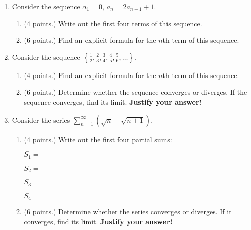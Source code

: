 \documentclass[12pt]{article}
\newcommand{\ds}{\displaystyle}
\newcommand{\points}[1]{(#1 points.)}		%
\begin{document}
\begin{enumerate}

\item Consider the sequence $a_1 = 0$, $a_n = 2a_{n-1} + 1$.
  \begin{enumerate}
  \item \points{4} Write out the first four terms of this sequence.
    \vfill

  \item \points{6} Find an explicit formula for the $n$th term of this sequence.
    \vfill
  \end{enumerate}

\item Consider the sequence $\ds \left\{ \frac{1}{2}, \frac{2}{3},
    \frac{3}{4}, \frac{4}{5}, \frac{5}{6}, \dots \right\}$.

  \begin{enumerate}
  \item \points{4} Find an explicit formula for the $n$th term of this sequence.
    \vfill

  \item \points{6} Determine whether the sequence converges or diverges. If the
    sequence converges, find its limit. {\bf Justify your answer!}
    \vfill
  \end{enumerate}

  \newpage

\item Consider the series $\ds \sum_{n=1}^{\infty} \left( \sqrt{n} -
    \sqrt{n+1} \right) $.
  \begin{enumerate}
  \item \points{4} Write out the first four partial sums:
    \vspace{0.3cm}

    $S_1 = $
    \vspace{0.3cm}

    $S_2 = $
    \vspace{0.3cm}

    $S_3 = $
    \vspace{0.3cm}

    $S_4 = $
    \vspace{0.3cm}

  \item \points{6} Determine whether the series converges or diverges. If it
    converges, find its limit. {\bf Justify your answer!}
    \vfill

  \end{enumerate}


\end{enumerate}
\end{document}
